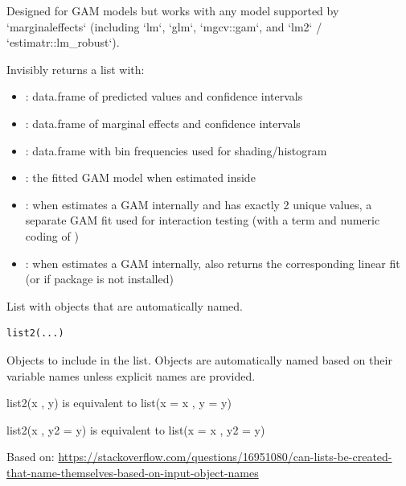 \documentclass[a4paper]{book}
\begin{document}
%
\begin{Details}
Designed for GAM models but works with any model supported by `marginaleffects`
(including `lm`, `glm`, `mgcv::gam`, and `lm2` / `estimatr::lm\_robust`).
\end{Details}
%
\begin{Value}
Invisibly returns a list with:
\begin{itemize}

\item{} : data.frame of predicted values and confidence intervals
\item{} : data.frame of marginal effects and confidence intervals
\item{} : data.frame with bin frequencies used for shading/histogram
\item{} : the fitted GAM model when estimated inside 
\item{} : when  estimates a GAM internally and 
has exactly 2 unique values, a separate GAM fit used for interaction testing (with a 
term and numeric coding of )
\item{} : when  estimates a GAM internally, also returns the
corresponding linear fit  (or  if package 
is not installed)

\end{itemize}

\end{Value}
%
\begin{Description}
List with objects that are automatically named.
\end{Description}
%
\begin{Usage}
\begin{verbatim}
list2(...)
\end{verbatim}
\end{Usage}
%
\begin{Arguments}
\begin{ldescription}
\item[\code{...}] Objects to include in the list. Objects are automatically named 
based on their variable names unless explicit names are provided.
\end{ldescription}
\end{Arguments}
%
\begin{Details}
list2(x , y)      is equivalent to list(x = x , y = y)

list2(x , y2 = y) is equivalent to list(x = x , y2 = y)

Based on: \url{https://stackoverflow.com/questions/16951080/can-lists-be-created-that-name-themselves-based-on-input-object-names}
\end{Details}
\end{document}
